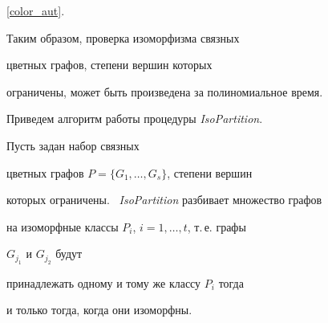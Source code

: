 \ref{color_aut}.





Таким образом, проверка изоморфизма связных


цветных графов, степени вершин которых


ограничены, может быть произведена за полиномиальное время.





Приведем алгоритм работы процедуры {\it IsoPartition}.


Пусть задан набор связных


цветных графов $P=\{G_1, \dotsc, G_s\}$, степени вершин


которых ограничены. \ {\it IsoPartition} разбивает множество графов


на изоморфные классы $P_i$, $i=1,\dotsc, t$, т.\,е. графы


$G_{j_1}$ и $G_{j_2}$ будут


принадлежать одному и тому же классу $P_i$ тогда


и только тогда, когда они изоморфны.





